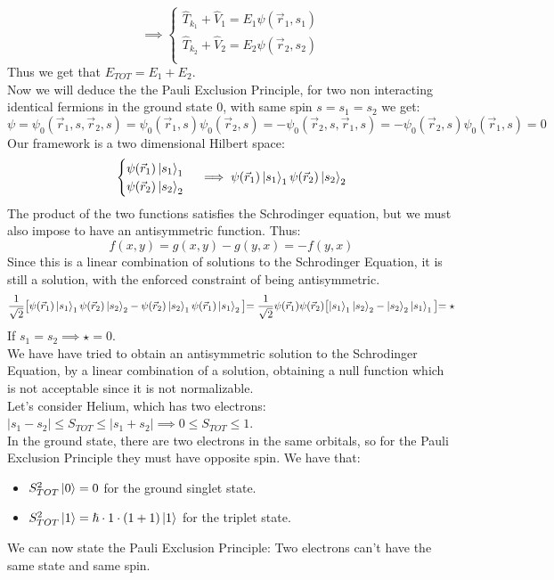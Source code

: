 \documentclass{article}
\begin{document}
$$ \implies \begin{cases}
     \hat{T}_{k_1}+ \hat{V}_1 = E_1\psi(\vec{r}_1,s_1) \\
     \hat{T}_{k_2}+ \hat{V}_2 = E_2\psi(\vec{r}_2,s_2) \\
\end{cases}$$
Thus we get that $E_{TOT} = E_1+ E_2$. \\
Now we will deduce the the Pauli Exclusion Principle, for two non interacting identical fermions in the ground state $0$, with same spin $s=s_1=s_2$ we get:
$$\psi = \psi_0(\vec{r}_1,s,\vec{r}_2,s)= \psi_0(\vec{r}_1,s)\psi_0(\vec{r}_2,s)= -\psi_0(\vec{r}_2,s,\vec{r}_1,s) = -  \psi_0(\vec{r}_2,s)\psi_0(\vec{r}_1,s)=0$$
Our framework is a two dimensional Hilbert space:
$$
\begin{cases}
\psi(\vec{r}_1)\ket{s_1}_1\\
\psi(\vec{r}_2)\ket{s_2}_2\\
\end{cases} \implies \psi(\vec{r}_1)\ket{s_1}_1\psi(\vec{r}_2)\ket{s_2}_2
$$
The product of the two functions satisfies the Schrodinger equation, but we must also impose to have an antisymmetric function. Thus:
$$f(x,y) = g(x,y)-g(y,x) = -f(y,x)$$
Since this is a linear combination of solutions to the Schrodinger Equation, it is still a solution, with the enforced constraint of being antisymmetric.
$$\frac{1}{\sqrt{2}}\bigl[\psi(\vec{r}_1)\ket{s_1}_1\psi(\vec{r}_2)\ket{s_2}_2-\psi(\vec{r}_2)\ket{s_2}_1\psi(\vec{r}_1)\ket{s_1}_2\bigl] = \frac{1}{\sqrt{2}}\psi(\vec{r}_1)\psi(\vec{r}_2) \bigl[ \ket{s_1}_1\ket{s_2}_2-\ket{s_2}_2\ket{s_1}_1 \bigl] = \star $$
If $s_1=s_2 \implies \star = 0 $.\\
We have have tried to obtain an antisymmetric solution to the Schrodinger Equation, by a linear combination of a solution, obtaining a null function which is not acceptable since it is not normalizable.\\
Let's consider Helium, which has two electrons:\\
$|s_1-s_2| \leq S_{TOT}  \leq |s_1+s_2| \implies 0  \leq S_{TOT}  \leq 1 $. \\ 
In the ground state, there are two electrons in the same orbitals, so for the Pauli Exclusion Principle they must have opposite spin. We have that:
\begin{itemize}
    \item $ S_{TOT}^2 \ket{0} = 0 $ for the ground singlet state.
\item $S_{TOT}^2 \ket{1} = \hslash \cdot 1 \cdot (1+1) \ket{1}$ for the triplet state.
\end{itemize}
We can now state the Pauli Exclusion Principle: Two electrons can't have the same state and same spin.
\end{document}
